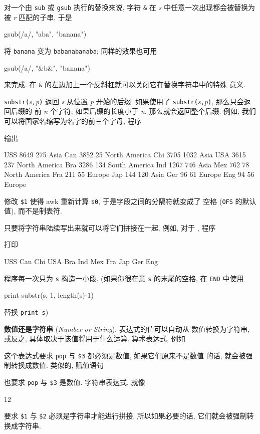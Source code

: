 对一个由 \verb'sub' 或 \verb'gsub' 执行的替换来说, 字符 \verb'&' 在
\textit{s} 中任意一次出现都会被替换为被 \textit{r} 匹配的子串, 于是
\begin{awkcode}
    gsub(/a/, "aba", "banana")
\end{awkcode}
将 \verb'banana' 变为 \verb'babanabanaba'; 同样的效果也可用
\begin{awkcode}
    gsub(/a/, "&b&", "banana")
\end{awkcode}
来完成. 在 \verb'&' 的左边加上一个反斜杠就可以关闭它在替换字符串中的特殊
意义.

\verb'substr('\textit{s}\verb','\textit{p}\verb')'
返回 \textit{s} 从位置 \textit{p} 开始的后缀. 如果使用了
\verb'substr('\textit{s}\verb','\textit{p}\verb')', 那么只会返回后缀的
前 \textit{n} 个字符; 如果后缀的长度小于 \textit{n}, 那么就会返回整个后缀.
例如, 我们可以将国家名缩写为名字的前三个字母, 程序
输出
\begin{awkcode}
    USS 8649 275 Asia
    Can 3852 25 North America
    Chi 3705 1032 Asia
    USA 3615 237 North America
    Bra 3286 134 South America
    Ind 1267 746 Asia
    Mex 762 78 North America
    Fra 211 55 Europe
    Jap 144 120 Asia
    Ger 96 61 Europe
    Eng 94 56 Europe
\end{awkcode}
修改 \verb'$1' 使得 awk 重新计算 \verb'$0', 于是字段之间的分隔符就变成了
空格 (\verb'OFS' 的默认值), 而不是制表符.

只要将字符串陆续写出来就可以将它们拼接在一起. 例如, 对于
, 程序
打印
\begin{awkcode}
    USS Can Chi USA Bra Ind Mex Fra Jap Ger Eng
\end{awkcode}
程序每一次只为 \verb's' 构造一小段. (如果你很在意 \verb's' 的末尾的空格,
在 \verb'END' 中使用
\begin{awkcode}
    print substr(s, 1, length(s)-1)
\end{awkcode}
替换 \verb'print s')

\textbf{数值还是字符串} (\emph{Number or String}). 表达式的值可以自动从
数值转换为字符串, 或反之, 具体取决于该值将用于什么运算. 算术表达式, 例如
这个表达式要求 \verb'pop' 与 \verb'$3' 都必须是数值, 如果它们原来不是数值
的话, 就会被强制转换成数值. 类似的, 赋值语句
也要求 \verb'pop' 与 \verb'$3' 是数值. 字符串表达式, 就像
\begin{awkcode}
    $1 $2
\end{awkcode}
要求 \verb'$1' 与 \verb'$2' 必须是字符串才能进行拼接, 所以如果必要的话,
它们就会被强制转换成字符串.

